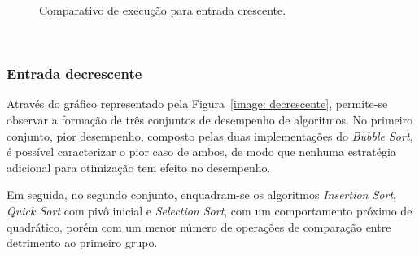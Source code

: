 \documentclass[conference,onecolumn]{IEEEtran}
\begin{document}
\begin{figure}[H]


\centering
{}
\caption{Comparativo de execução para entrada crescente.}
\label{image: crescente}
\end{figure}

~\\
\subsubsection{Entrada decrescente}

Através do gráfico representado pela Figura~\ref{image: decrescente}, permite-se observar a formação de três conjuntos de desempenho de algoritmos. No primeiro conjunto, pior desempenho, composto pelas duas implementações do \textit{Bubble Sort}, é possível caracterizar o pior caso de ambos, de modo que nenhuma estratégia adicional para otimização tem efeito no desempenho. 

Em seguida, no segundo conjunto, enquadram-se os algoritmos \textit{Insertion Sort}, \textit{Quick Sort} com pivô inicial e \textit{Selection Sort}, com um comportamento próximo de quadrático, porém com um menor número de operações de comparação entre detrimento ao primeiro grupo.
\end{document}
